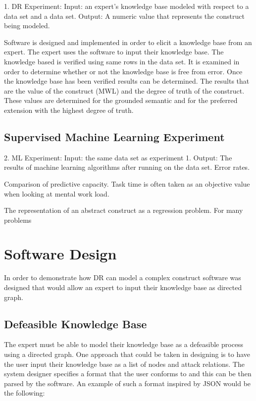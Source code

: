 1. DR Experiment: Input: an expert's knowledge base modeled with respect to a data set and a data set. Output: A numeric value that represents the construct being modeled.


Software is designed and implemented in order to elicit a knowledge base from an expert.
The expert uses the software to input their knowledge base.
The knowledge based is verified using same rows in the data set. It is examined in order to determine whether or not the knowledge base is free from error.
Once the knowledge base has been verified results can be determined. The results that are the value of the construct (MWL) and the degree of truth of the construct. These values are determined for the grounded semantic and for the preferred extension with the highest degree of truth. 

\subsection{Supervised Machine Learning Experiment}


2. ML Experiment: Input: the same data set as experiment 1.
Output: The results of machine learning algorithms after running on the data set. Error rates.

Comparison of predictive capacity.
Task time is often taken as an objective value when looking at mental work load.

The representation of an abstract construct as a regression problem. For many problems 






\section{Software Design}

In order to demonstrate how DR can model a complex construct software was designed that would allow an expert to input their knowledge base as directed graph.
\subsection{Defeasible Knowledge Base}
The expert must be able to model their knowledge base as a defeasible process using a directed graph. One approach that could be taken in designing is to have the user input their knowledge base as a list of nodes and attack relations. The system designer specifies a format that the user conforms to and this can be then parsed by the software. An example of such a format inspired by JSON would be the following:

